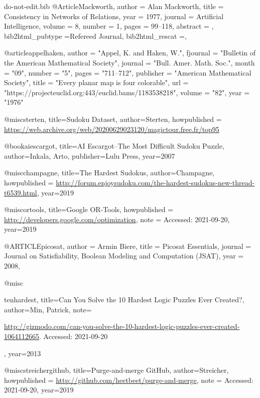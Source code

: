 \documentclass{ieeeaccess}
\begin{document}
{\begin{filecontents*}[overwrite]{do-not-edit.bib}
		@Article{Mackworth,
			author =       {Alan Mackworth},
			title =        {{C}onsistency in {N}etworks of {R}elations},
			year =         {1977},
			journal =      {Artificial Intelligence},
			volume =       {8},
			number =       {1},
			pages =         {99--118},
			abstract =     { },
			bib2html_pubtype ={Refereed Journal},
			bib2html_rescat ={},
		}
		
		@article{appelhaken,
			author = "Appel, K. and Haken, W.",
			fjournal = "Bulletin of the American Mathematical Society",
			journal = "Bull. Amer. Math. Soc.",
			month = "09",
			number = "5",
			pages = "711--712",
			publisher = "American Mathematical Society",
			title = "Every planar map is four colorable",
			url = "https://projecteuclid.org:443/euclid.bams/1183538218",
			volume = "82",
			year = "1976"
		}
		
		@misc{sterten,
			title={{S}udoku {D}ataset},
			author={Sterten},
			howpublished = {\url{https://web.archive.org/web/20200629023120/magictour.free.fr/top95}}
		}
		
		@book{aiescargot,
			title={AI Escargot--The Most Difficult Sudoku Puzzle},
			author={Inkala, Arto},
			publisher={Lulu Press},
			year={2007}
		}
		
		@misc{champagne,
			title={{T}he {H}ardest {S}udokus},
			author={Champagne},
			howpublished = {\url{http://forum.enjoysudoku.com/the-hardest-sudokus-new-thread-t6539.html}},
			year={2019}
		}
		
		@misc{ortools,
			title={Google {OR}-{T}ools},
			howpublished = {\url{http://developers.google.com/optimization}},
			note = {Accessed: 2021-09-20},
			year={2019}
		}
		
		@ARTICLE{picosat,
			author = {Armin Biere},
			title = {{P}icosat {E}ssentials},
			journal = {Journal on Satisfiability, Boolean Modeling and Computation ({JSAT})},
			year = {2008},
		}
		
		@misc{tenhardest,
			title={Can You Solve the 10 Hardest Logic Puzzles Ever Created?},
			author={Min, Patrick},
			note={
				\href{http://gizmodo.com/can-you-solve-the-10-hardest-logic-puzzles-ever-created-1064112665}{http://gizmodo.com/can-you-solve-the-10-hardest-logic-puzzles-ever-created-1064112665}.
				Accessed: 2021-09-20
				
			},
			year={2013}
		}
		
		
		@misc{streichergithub,
			title={Purge-and-merge {G}it{H}ub},
			author={Streicher},
			howpublished = {\url{http://github.com/heetbeet/purge-and-merge}},
			note = {Accessed: 2021-09-20},
			year={2019}
		}
		

\end{filecontents*}}
\end{document}
